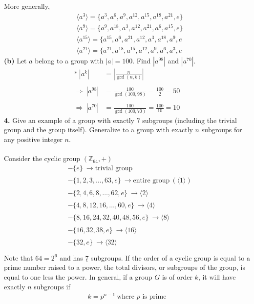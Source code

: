 \documentclass[12pt, letterpaper]{article}
\begin{document}
More generally,
\begin{align*}
    &\boxed{\langle{a^{3}}\rangle = \{a^{3}, a^{6}, a^{9}, a^{12}, a^{15}, a^{18}, a^{21}, e\}} \\
    &\boxed{\langle a^{9} \rangle = \{a^{9}, a^{18}, a^{3}, a^{12}, a^{21}, a^{6}, a^{15}, e\}} \\
    &\boxed{\langle a^{15} \rangle = \{a^{15}, a^{6}, a^{21}, a^{12}, a^{3}, a^{18}, a^{9}, e} \\
    &\boxed{\langle a^{21} \rangle = \{a^{21}, a^{18}, a^{15}, a^{12}, a^{9}, a^{6}, a^{3}, e}
\end{align*}
\indent \textbf{(b)} Let $a$ belong to a group with $|a| = 100$. Find $|a^{98}|$ and $|a^{70}|$.
\begin{align*}
    * \ |a^{k}| &= |\frac{n}{\gcd(n,k)}| \\ \\
    \Rightarrow \ |a^{98}| &= \frac{100}{\gcd(100, 98)} = \frac{100}{2} = \boxed{50} \\ \\
    \Rightarrow \ |a^{70}| &= \frac{100}{\gcd(100, 70)} = \frac{100}{10} = \boxed{10}
\end{align*}
\vspace{0.2 em}
\textbf{4.} Give an example of a group with exactly $7$ subgroups (including the trivial group and the group itself). Generalize to a group with exactly $n$ subgroups for any positive integer $n.$ \\ \\
Consider the cyclic group $(\mathbb{Z}_{64}, +)$
\begin{align*}
    &- \{e\} \  \xrightarrow[]{} \text{trivial group} \\
    &- \{1,2,3,\ldots,63, e\} \ \xrightarrow[]{} \text{entire group} \ (\langle 1 \rangle) \\
    &- \{2, 4, 6, 8, \ldots, 62, e\} \ \xrightarrow[]{} \langle 2 \rangle \\
    &- \{4, 8 , 12, 16, \ldots, 60, e\} \ \xrightarrow[]{} \langle 4 \rangle \\
    &- \{8, 16, 24, 32, 40, 48, 56, e\} \ \xrightarrow[]{} \langle 8 \rangle \\
    &- \{16, 32, 38, e\} \ \xrightarrow[]{} \langle 16 \rangle \\
    &- \{32, e\} \ \xrightarrow[]{} \langle 32 \rangle \\
\end{align*}
Note that $64 = 2^{\underline{6}}$ and has $\underline{7}$ subgroups. If the order of a cyclic group is equal to a prime number raised to a power, the total divisors, or subgroups of the group, is equal to one less the power. In general, if a group $G$ is of order $k$, it will have exactly $n$ subgroups if \begin{align*}
    k = p^{n-1} \ \text{where $p$ is prime}
\end{align*}
\end{document}
